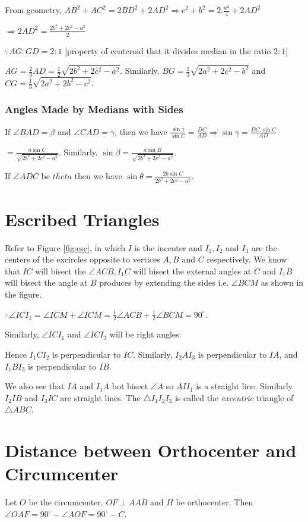 From geometry, $AB^2 + AC^2 = 2BD^2 + 2AD^2 \Rightarrow c^2 + b^2 = 2.\frac{a^2}{4} + 2AD^2$

$\Rightarrow 2AD^2 = \frac{2b^2 + 2c^2 - a^2}{2}$

$\because AG:GD = 2:1$ [property of centeroid that it divides median in the ratio $2:1$]

$AG = \frac{2}{3}AD = \frac{1}{2}\sqrt{2b^2 + 2c^2 - a^2}$. Similarly, $BG = \frac{1}{3}\sqrt{2a^2 + 2c^2 - b^2}$ and $CG =
\frac{1}{3}\sqrt{2a^2 + 2b^2 - c^2}$.

\subsubsection{Angles Made by Medians with Sides}
If $\angle BAD = \beta$ and $\angle CAD = \gamma$, then we have $\frac{\sin\gamma}{\sin C} = \frac{DC}{AD} \Rightarrow \sin\gamma =
\frac{DC.\sin C}{AD}$

$= \frac{a\sin C}{\sqrt{2b^2 + 2c^2 - a^2}}$. Similarly, $\sin\beta = \frac{a\sin B}{\sqrt{2b^2 + 2c^2 - a^2}}$.

If $\angle ADC$ be $theta$ then we have $\sin\theta = \frac{2b\sin C}{2b^2 + 2c^2 - a^2}$.

\section{Escribed Triangles}
Refer to Figure {\ref{fig:esc}}, in which $I$ is the incenter and $I_1, I_2$ and $I_3$ are the centers of the excircles opposite to
vertices $A, B$ and $C$ respectively. We know that $IC$ will bisect the $\angle ACB, I_1C$ will bisect the external angles at $C$
and $I_1B$ will bisect the angle at $B$ produces by extending the sides i.e. $\angle BCM$ as shown in the figure.

$\therefore \angle ICI_1 = \angle ICM + \angle ICM = \frac{1}{2}\angle ACB + \frac{1}{2}\angle BCM = 90^\circ$.

Similarly, $\angle ICI_1$ and $\angle ICI_3$ will be right angles.

Hence $I_1CI_2$ is perpendicular to $IC$. Similarly, $I_2AI_3$ is perpendicular to $IA$, and $I_1BI_3$ is perpendicular to $IB$.

We also see that $IA$ and $I_1A$ bot bisect $\angle A$ so $AII_1$ is a straight line. Similarly $I_2IB$ and $I_3IC$ are straight
lines.
The $\triangle I_1I_2I_3$ is called the {\it excentric} triangle of $\triangle ABC$.

\section{Distance between Orthocenter and Circumcenter}
Let $O$ be the circumcenter. $OF\perp AAB$ and $H$ be orthocenter. Then $\angle OAF = 90^\circ - \angle AOF = 90^\circ - C$.

